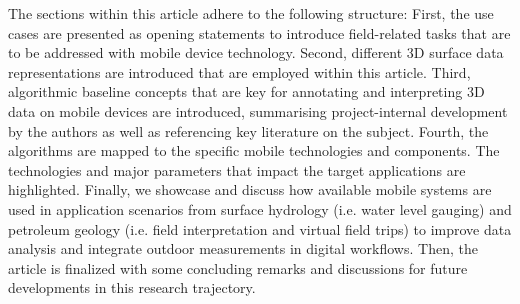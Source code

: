 \documentclass[review]{elsarticle}
\begin{document}

The sections within this article adhere to the following structure: First, the use cases are presented as opening statements to introduce field-related tasks that are to be addressed with mobile device technology. Second, different 3D surface data representations are introduced that are employed within this article. Third, algorithmic baseline concepts that are key for annotating and interpreting 3D data on mobile devices are introduced, summarising project-internal development by the authors as well as referencing key literature on the subject. Fourth, the algorithms are mapped to the specific mobile technologies and components. The technologies and major parameters that impact the target applications are highlighted. Finally, we showcase and discuss how available mobile systems are used in application scenarios from surface hydrology (i.e. water level gauging) and petroleum geology (i.e. field interpretation and virtual field trips) to improve data analysis and integrate outdoor measurements in digital workflows. Then, the article is finalized with some concluding remarks and discussions for future developments in this research trajectory.
\end{document}
